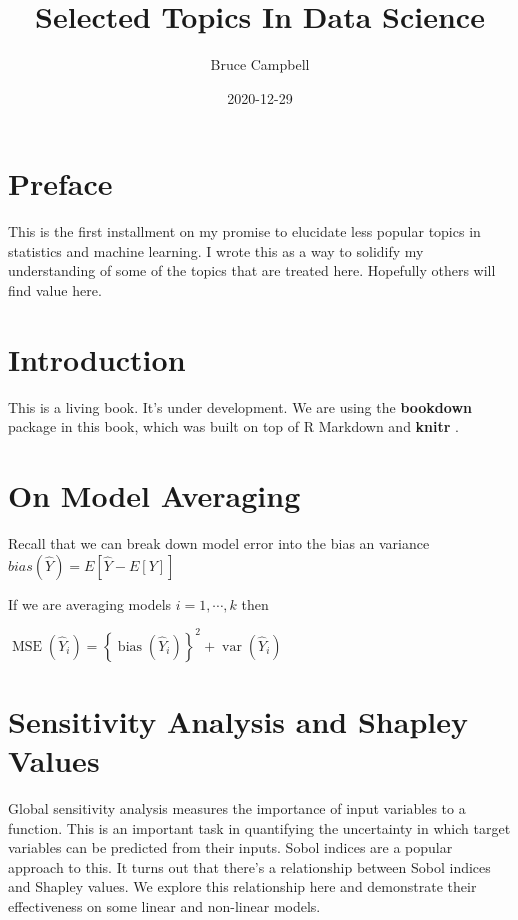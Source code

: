 \documentclass[
]{book}
\title{Selected Topics In Data Science}
\author{Bruce Campbell}
\date{2020-12-29}
\begin{document}
\maketitle

{
\setcounter{tocdepth}{1}
\tableofcontents
}
\hypertarget{preface}{%
\chapter{Preface}\label{preface}}

This is the first installment on my promise to elucidate less popular topics in statistics and machine learning. I wrote this as a way to solidify my understanding of some of the topics that are treated here. Hopefully others will find value here.

\hypertarget{intro}{%
\chapter{Introduction}\label{intro}}

This is a living book. It's under development. We are using the \textbf{bookdown} package \citep{R-bookdown} in this book, which was built on top of R Markdown and \textbf{knitr} \citep{xie2015}.

\hypertarget{on-model-averaging}{%
\chapter{On Model Averaging}\label{on-model-averaging}}

Recall that we can break down model error into the bias an variance \(bias(\hat{Y})= E[\hat{Y}-E[Y]]\)

If we are averaging models \(i=1, \cdots ,k\) then

\(\operatorname{MSE}\left(\hat{Y}_{i}\right)=\left\{\operatorname{bias}\left(\hat{Y}_{i}\right)\right\}^{2}+\operatorname{var}\left(\hat{Y}_{i}\right)\)

\hypertarget{sensitivity-analysis-and-shapley-values}{%
\chapter{Sensitivity Analysis and Shapley Values}\label{sensitivity-analysis-and-shapley-values}}

Global sensitivity analysis measures the importance of input variables to a function. This is an important task in quantifying the uncertainty in which target variables can be predicted from their inputs. Sobol indices are a popular approach to this. It turns out that there's a relationship between Sobol indices and Shapley values. We explore this relationship here and demonstrate their effectiveness on some linear and non-linear models.
\end{document}
